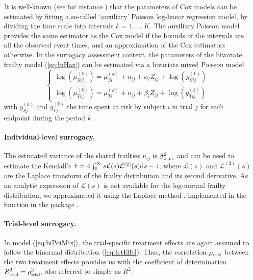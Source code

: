 \documentclass[]{scrartcl}\usepackage[]{graphicx}\usepackage[]{color}
\begin{document}
{{It is well-known (see for instance \cite{Whitehead80, crowtherEtal12})
  that the parameters of Cox models can be estimated by fitting
  a so-called `auxiliary' Poisson log-linear regression model,
  by dividing the time scale into intervals $k=1, \ldots, K$.
The auxiliary Poisson model provides the same estimator as the Cox model
  if the bounds of the intervals are all the observed event times,
  and an approximation of the Cox estimators otherwise.
In the surrogacy assessment context,
  the parameters of the bivariate frailty model (\ref{eq:biHaz})
  can be estimated via a bivariate mixed Poisson model
  \begin{equation}
    \begin{cases}
      \log\left( \mu_{S ij}^{(k)} \right) = 
        \mu_{S i}^{(k)}  + u_{ij}
        + \alpha_i Z_{ij}
        + \log\left(y_{S ij}^{(k)} \right)\\
      \log\left( \mu_{T ij}^{(k)} \right) = 
        \mu_{T i}^{(k)}  + u_{ij}
        + \beta_i Z_{ij}
        + \log\left(y_{T ij}^{(k)} \right)
    \end{cases}
    \label{eq:biPoiMix}
  \end{equation}
  with $y_{Sj}^{(k)}$ and $y_{Tj}^{(k)}$ the time spent at risk
  by subject $i$ in trial $j$ for each endpoint
  during the period $k$.


\paragraph{Individual-level surrogacy.}
The estimated variance of the shared frailties $u_{ij}$
  is $\hat\sigma^2_\text{\tiny indiv}$ and 
  can be used to estimate the Kendall's
$\hat\tau = 4 \int_0^\infty s \mathcal L(s)\mathcal L^{(2)}(s) \textrm d s - 1$,
where $\mathcal L(s)$ and $\mathcal L^{(2)}(s)$
are the Laplace transform of the frailty distribution and its
second derivative.
As an analytic expression of $\mathcal L(s)$
is not available for the log-normal frailty distribution,
we approximated it using the Laplace method \citep{GoutisCasella99},
implemented in the  function
in the  package \citep{parfmJSS, R:parfm}.


\paragraph{Trial-level surrogacy.} \label{sec:trialDep}
In model (\ref{eq:biPoiMix}),
  the trial-specific treatment effects are again assumed to follow
  the binormal distribution (\ref{eq:trtEffs}).
Thus, the correlation $\rho_\text{\tiny trial}$
  between the two treatment effects provides us with 
  the coefficient of determination
  $R^2_\text{\tiny trial} = \rho^2_\text{\tiny trial}$,
  also referred to simply as $R^2$.


}}
\end{document}
